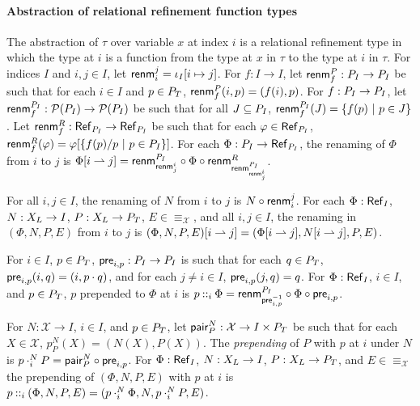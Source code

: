 \paragraph{Abstraction of relational refinement function types}
%
The abstraction of $\tau$ over variable $x$ at index $i$ is a
relational refinement type in which the type at $i$ is a function from
the type at $x$ in $\tau$ to the type at $i$ in $\tau$.
For indices $I$ and $i, j \in I$, let
$\mathsf{renm}_{i}^{j} = \iota_I  [ i \mapsto j ]$.
For $f : I \to I$, let $\mathsf{renm}_{f}^P : P_{I} \to P_{I}$ be
such that for each $i \in I$ and $p \in P_T$,
$\mathsf{renm}_{f}^P(i, p) = (f(i), p)$.
For $f : P_{I} \to P_{I}$, let
$\mathsf{renm}_{f}^{P_I} : \mathcal{P}(P_{I}) \to \mathcal{P}(P_{I})$ be such
that for all $J \subseteq P_{I}$, $\renameidxpos{f}(J) = %
\setformer{ f(p) }{ p \in J }$.
Let
$\mathsf{renm}_{f}^R : \mathsf{Ref}_{ P_{I} } \to \mathsf{Ref}_{ P_{I} }$
be such that for each $\varphi \in \mathsf{Ref}_{ P_{I} }$,
$\mathsf{renm}_{f}^R(\varphi) = \varphi[ \{  f(p) / p \ |\  p \in
  P_{I}  \} ]$.
%
For each $\Phi : P_{I} \to \mathsf{Ref}_{ P_{I} }$, the renaming
of $\Phi$ from $i$ to $j$ is
$ \Phi [  i  \rightharpoonup  j  ] = \mathsf{renm}_{ \mathsf{renm}_{j}^{i} }^{P_I} \circ
\Phi \circ \mathsf{renm}_{ \mathsf{renm}_{ \mathsf{renm}_{j}^{i} }^{P_I} }^R$.

For all $i, j \in I$, the renaming of $N$ from $i$ to $j$ is
$N \circ \mathsf{renm}_{i}^{j}$.
%
For each $\Phi : \mathsf{Ref}_{ I }$, $N : X_L \to I$,
$P : X_L \to P_T$, $E \in \equiv_{\mathcal{X}}$, and all
$i, j \in I$, the renaming in $(\Phi, N, P, E)$ from $i$ to $j$ is
$(\Phi, N, P, E) [  i  \rightharpoonup  j  ] = ( \Phi [  i  \rightharpoonup  j  ],
 N [  i  \rightharpoonup  j  ], P, E)$.

For $i \in I$, $p \in P_T$,
$\mathsf{pre}_{i, p} : P_{I} \to P_{I}$ is such that for each
$q \in P_T$, $\mathsf{pre}_{i, p}(i, q) = (i, p \cdot q)$, and for
each $j \not= i \in I$, $\mathsf{pre}_{i, p}(j, q) = q$.
%
For $\Phi : \mathsf{Ref}_{ I }$, $i \in I$, and $p \in P_T$, $p$
prepended to $\Phi$ at $i$ is $p \prepend{i} \Phi = %
\renameidxpos{ \inv{ \prependpos{i}{p} } } \compose \Phi \compose
\prependpos{i}{p}$.

For $N : \mathcal{X} \to I$, $i \in I$, and $p \in P_T$, let
$\mathsf{pair}_{P}^N : \mathcal{X} \to I \times P_T$ be such that
for each $X \in \mathcal{X}$, $p_{P}^N(X) = (N(X), P(X))$.
%
The \emph{prepending} of $P$ with $p$ at $i$ under $N$ is
$p \cdot_{i}^{N} P = \mathsf{pair}_{P}^{N} \circ
\mathsf{pre}_{i, p}$.
%
For $\Phi : \mathsf{Ref}_{ I }$, $N : X_L \to I$,
$P : X_L \to P_T$, and $E \in \equiv_{\mathcal{X}}$ the
prepending of $(\Phi, N, P, E)$ with $p$ at $i$ is
$p \mathbin{::}_{i} (\Phi, N, P, E) = (p \cdot_{i}^{N} \Phi, N, p
\cdot_{i}^{N} P, E)$.

